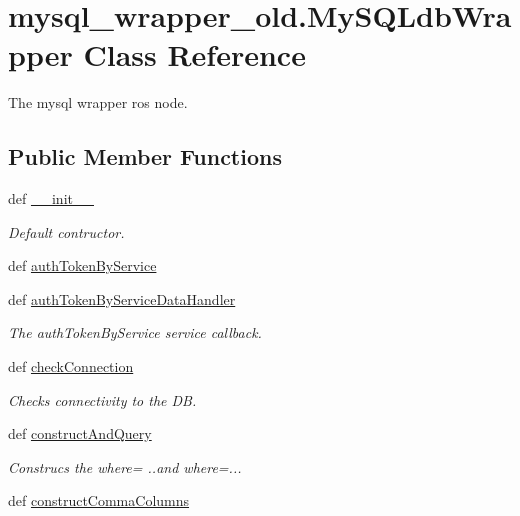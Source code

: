\hypertarget{classmysql__wrapper__old_1_1MySQLdbWrapper}{\section{mysql\-\_\-wrapper\-\_\-old.\-My\-S\-Q\-Ldb\-Wrapper Class Reference}
\label{classmysql__wrapper__old_1_1MySQLdbWrapper}
}


The mysql wrapper ros node.  


\subsection*{Public Member Functions}
\begin{DoxyCompactItemize}
\item 
def \hyperlink{classmysql__wrapper__old_1_1MySQLdbWrapper_ae65400b245dad40c6f11d2be516a4772}{\-\_\-\-\_\-init\-\_\-\-\_\-}
\begin{DoxyCompactList}\small\item\em Default contructor. \end{DoxyCompactList}\item 
def \hyperlink{classmysql__wrapper__old_1_1MySQLdbWrapper_a676b254e0e94a85519dfbafc68c3ba76}{auth\-Token\-By\-Service}
\item 
def \hyperlink{classmysql__wrapper__old_1_1MySQLdbWrapper_a1d2e2f608cdb23173bf663c6832f4ada}{auth\-Token\-By\-Service\-Data\-Handler}
\begin{DoxyCompactList}\small\item\em The auth\-Token\-By\-Service service callback. \end{DoxyCompactList}\item 
def \hyperlink{classmysql__wrapper__old_1_1MySQLdbWrapper_aa956f647be137d357af4c4100433d0a4}{check\-Connection}
\begin{DoxyCompactList}\small\item\em Checks connectivity to the D\-B. \end{DoxyCompactList}\item 
def \hyperlink{classmysql__wrapper__old_1_1MySQLdbWrapper_ad7dad8758078faf425d2d449575d7414}{construct\-And\-Query}
\begin{DoxyCompactList}\small\item\em Construcs the where= ..and where=... \end{DoxyCompactList}\item 
def \hyperlink{classmysql__wrapper__old_1_1MySQLdbWrapper_a1ddf27c1b8da82cea24207a911100ac9}{construct\-Comma\-Columns}

\end{DoxyCompactItemize}
